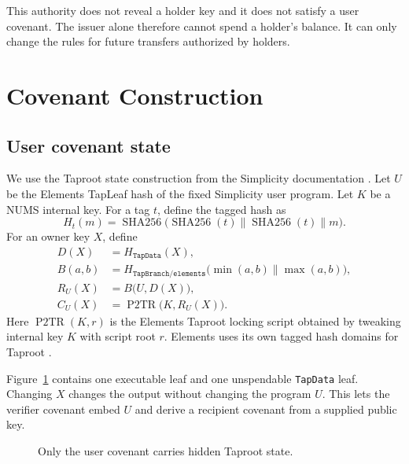 \documentclass[11pt]{article}
\newcommand{\sha}{\operatorname{SHA256}}
\newcommand{\pTwoTR}{\operatorname{P2TR}}
\newcommand{\concat}{\mathbin\|}
\begin{document}
    This authority does not reveal a holder key and it does not satisfy a user covenant.
    The issuer alone therefore cannot spend a holder's balance.
    It can only change the rules for future transfers authorized by holders.


    \section{Covenant Construction}
    \label{sec:construction}

    \subsection{User covenant state}

    We use the Taproot state construction from the Simplicity documentation \cite{simplicity-state,bip341}.
    Let $U$ be the Elements TapLeaf hash of the fixed Simplicity user program.
    Let $K$ be a NUMS internal key.
    For a tag $t$, define the tagged hash as
    \begin{equation}
        H_t(m)=\sha\bigl(\sha(t)\concat\sha(t)\concat m\bigr).
    \end{equation}
    For an owner key $X$, define
    \begin{align}
        D(X) &= H_{\mathtt{TapData}}(X), \\
        B(a,b) &= H_{\mathtt{TapBranch/elements}}
        \bigl(\min(a,b)\concat\max(a,b)\bigr), \\
        R_U(X) &= B\bigl(U,D(X)\bigr), \\
        C_U(X) &= \pTwoTR\bigl(K,R_U(X)\bigr).
    \end{align}
    Here $\pTwoTR(K,r)$ is the Elements Taproot locking script obtained by tweaking internal key $K$ with script root $r$.
    Elements uses its own tagged hash domains for Taproot \cite{elements-taproot}.

    Figure~\ref{fig:user-tree} contains one executable leaf and one unspendable \texttt{TapData} leaf.
    Changing $X$ changes the output without changing the program $U$.
    This lets the verifier covenant embed $U$ and derive a recipient covenant from a supplied public key.

    \begin{figure}[ht]
        \centering
        \caption{Only the user covenant carries hidden Taproot state.}
        \label{fig:user-tree}
    \end{figure}
\end{document}
